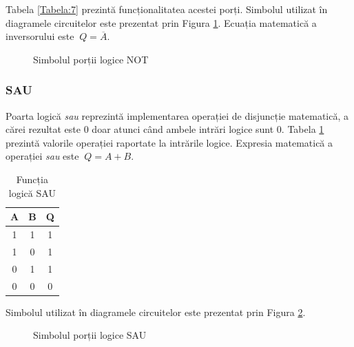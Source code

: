 \documentclass[12pt]{article}
\begin{document}
Tabela \ref{Tabela:7} prezintă funcționalitatea acestei porți. Simbolul utilizat în diagramele circuitelor este prezentat prin Figura \ref{Figura:5}. Ecuația matematică a inversorului este $\ Q = \overline{A}$.


 \begin{figure}[h!]
 \centering
 \caption{Simbolul porții logice NOT}
 \label{Figura:5}
\end{figure}
 
\subsubsection{SAU}
Poarta logică \textit{sau} reprezintă implementarea operației de disjuncție matematică, a cărei rezultat este 0 doar atunci când ambele intrări logice sunt 0. Tabela \ref{Tabela:8} prezintă valorile operației raportate la intrările logice. Expresia matematică a operației \textit{sau} este $\ Q = A+B$.
 \begin{table}[h]
\centering
\caption{Funcția logică SAU}
\label{Tabela:8}
\begin{tabular}{ ||c|c|c|| }
 \hline
 A & B & Q\\ 
 \hline  \hline
 1 & 1 & 1 \\
 \hline
 1 & 0 & 1 \\
 \hline
 0 & 1 & 1 \\
 \hline 
 0 & 0 & 0 \\
 \hline
\end{tabular}
\end{table}

Simbolul utilizat în diagramele circuitelor este prezentat prin Figura \ref{Figura:6}.

 \begin{figure}[h!]
 \centering
 \caption{Simbolul porții logice SAU}
 \label{Figura:6}
 \end{figure}
 
\end{document}

